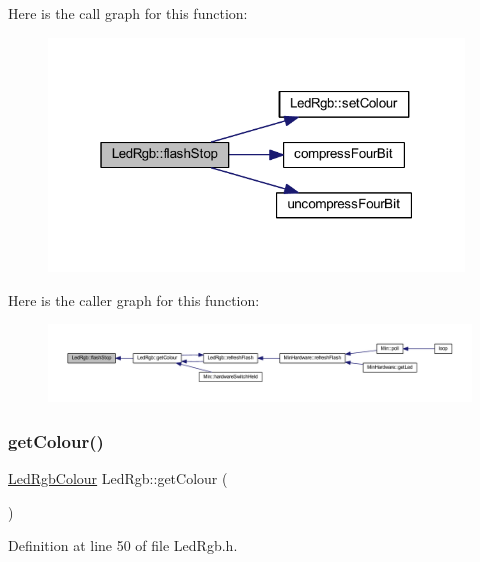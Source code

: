 Here is the call graph for this function\+:
\nopagebreak
\begin{figure}[H]
\begin{center}
\leavevmode
\includegraphics[width=313pt]{dc/d6d/class_led_rgb_a096a0af0eb4d3c5d4c6a3f4b3aaeb9e7_cgraph}
\end{center}
\end{figure}
Here is the caller graph for this function\+:
\nopagebreak
\begin{figure}[H]
\begin{center}
\leavevmode
\includegraphics[width=350pt]{dc/d6d/class_led_rgb_a096a0af0eb4d3c5d4c6a3f4b3aaeb9e7_icgraph}
\end{center}
\end{figure}
\mbox{\label{class_led_rgb_a542e3bf6bcf1f05df3cc442522787948}} 
\subsubsection{\texorpdfstring{get\+Colour()}{getColour()}}
{\footnotesize\ttfamily \hyperlink{class_led_rgb_af328c665510f921f0dfed643f939087b}{Led\+Rgb\+Colour} Led\+Rgb\+::get\+Colour (\begin{DoxyParamCaption}{ }\end{DoxyParamCaption})\hspace{0.3cm}{\ttfamily [inline]}}



Definition at line 50 of file Led\+Rgb.\+h.

